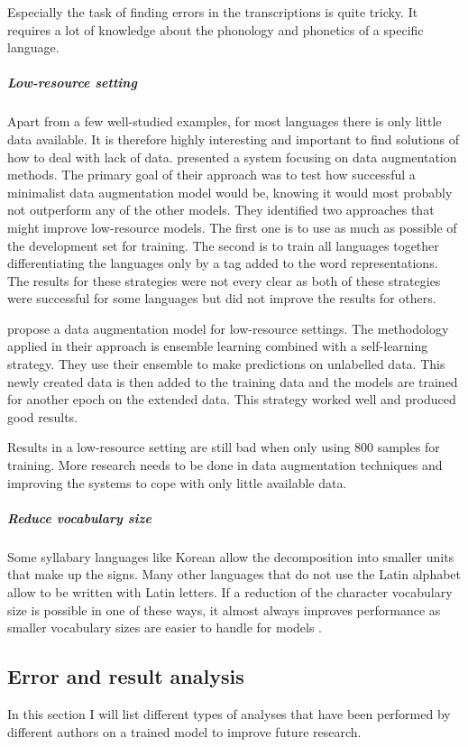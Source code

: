 Especially the task of finding errors in the transcriptions is quite tricky. It requires a lot of knowledge about the phonology and phonetics of a specific language. 

\subparagraph{Low-resource setting}
Apart from a few well-studied examples, for most languages there is only little data available. It is therefore highly interesting and important to find solutions of how to deal with lack of data. \cite{hammond-2021-data} presented a system focusing on data augmentation methods. The primary goal of their approach was to test how successful a minimalist data augmentation model would be, knowing it would most probably not outperform any of the other models. They identified two approaches that might improve low-resource models. The first one is to use as much as possible of the development set for training. The second is to train all languages together differentiating the languages only by a tag added to the word representations. The results for these strategies were not every clear as both of these strategies were successful for some languages but did not improve the results for others.

\citet{yu-etal-2020} propose a data augmentation model for low-resource settings. The methodology applied in their approach is ensemble learning combined with a self-learning strategy. They use their ensemble to make predictions on unlabelled data. This newly created data is then added to the training data and the models are trained for another epoch on the extended data. This strategy worked well and produced good results. 

Results in a low-resource setting are still bad when only using 800 samples for training. More research needs to be done in data augmentation techniques and improving the systems to cope with only little available data.

\subparagraph{Reduce vocabulary size}
Some syllabary languages like Korean allow the decomposition into smaller units that make up the signs. Many other languages that do not use the Latin alphabet allow to be written with Latin letters. If a reduction of the character vocabulary size is possible in one of these ways, it almost always improves performance as smaller vocabulary sizes are easier to handle for models \citep{gorman-etal-2020-sigmorphon}. 


\subsection{Error and result analysis}
In this section I will list different types of analyses that have been performed by different authors on a trained model to improve future research.

